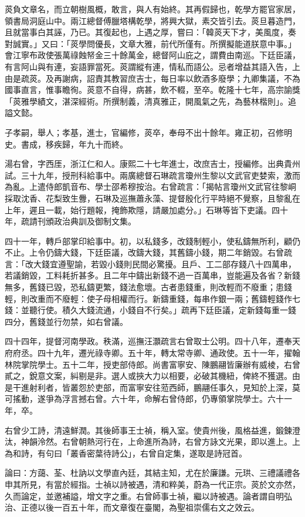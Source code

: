 \begin{pinyinscope}
菼負文章名，而立朝樹風概，敢言，與人有始終。其再假歸也，乾學方罷官家居，領書局洞庭山中。兩江總督傅臘塔構乾學，將興大獄，素交皆引去。菼旦暮造門，且就當事白其誣，乃已。其復起也，上遇之厚，嘗曰：「韓菼天下才，美風度，奏對誠實。」又曰：「菼學問優長，文章大雅，前代所僅有。所撰擬能道朕意中事。」會江寧布政使張萬祿蝕帑金三十餘萬金，總督阿山庇之，謂費由南巡。下廷臣議，有言阿山與有連，妄語罪當死。菼謂縱有連，情私而語公。忌者增益其語入告，上由是疏菼。及再謝病，詔責其教習庶吉士，每日率以飲酒多廢學；九卿集議，不為國事直言，惟事瞻徇。菼意不自得，病甚，飲不輟，至卒。乾隆十七年，高宗諭獎「菼雅學績文，湛深經術。所撰制義，清真雅正，開風氣之先，為藝林楷則」。追謚文懿。

子孝嗣，舉人；孝基，進士，官編修，菼卒，奉母不出十餘年。雍正初，召修明史。書成，移疾歸，年九十而終。

湯右曾，字西厓，浙江仁和人。康熙二十七年進士，改庶吉士，授編修。出典貴州試。三十九年，授刑科給事中。兩廣總督石琳疏言瓊州生黎以文武官吏婪索，激而為亂。上遣侍郎凱音布、學士邵希穆按治。右曾疏言：「揭帖言瓊州文武官往黎峒採取沈香、花梨致生釁，石琳及巡撫蕭永藻、提督殷化行平時絕不覺察，且黎亂在上年，遲且一載，始行題報，掩飾欺隱，請嚴加處分。」石琳等皆下吏議。四十年，疏請刊頒政治典訓及御制文集。

四十一年，轉戶部掌印給事中。初，以私錢多，改錢制輕小，使私鑄無所利，顧仍不止。上令仍鑄大錢，下廷臣議，改鑄大錢，其舊鑄小錢，期二年銷毀。右曾疏言：「改大錢宜遵聖諭，若毀小錢則民間必驚擾。且戶、工二部存錢八十四萬串，若議銷毀，工料耗折甚多。且二年中鑄出新錢不過一百萬串，豈能遍及各省？新錢無多，舊錢已毀，恐私鑄更繁，錢法愈壞。古者患錢重，則改輕而不廢重；患錢輕，則改重而不廢輕：使子母相權而行。新鑄重錢，每串作銀一兩；舊鑄輕錢作七錢：並聽行使。積久大錢流通，小錢自不行矣。」疏再下廷臣議，定新錢每重一錢四分，舊錢並行勿禁，如右曾議。

四十四年，提督河南學政。秩滿，巡撫汪灝疏言右曾取士公明。四十八年，遷奉天府府丞。四十九年，遷光祿寺卿。五十年，轉太常寺卿、通政使。五十一年，擢翰林院掌院學士。五十二年，授吏部侍郎。尚書富寧安、陳鵬翮皆廉辦有威棱，右曾貳之，銳意文案，糾剔是非。選人或挾大力以相要，必破其機紐，俾終不獲選。由是干進射利者，皆叢怨於吏部，而富寧安往蒞西師，鵬翮任事久，見知於上深，莫可搖動，遂爭為浮言撼右曾。六十年，命解右曾侍郎，仍專領掌院學士。六十一年，卒。

右曾少工詩，清遠鮮潤。其後師事王士禎，稱入室。使貴州後，風格益進，鍛鍊澄汰，神韻泠然。右曾朝熱河行在，上命進所為詩，右曾方詠文光果，即以進上。上為和詩，有句曰「叢香密葉待詩公」，右曾自定集，遂取是詩冠首。

論曰：方藹、荃、杜訥以文學直內廷，其結主知，尤在於廉謙。元珙、三禮議禮各申其所見，有當於經指。士禎以詩被遇，清和粹美，蔚為一代正宗。菼於文亦然，久而論定，並邀補謚，增文字之重。右曾師事士禎，繼以詩被遇。論者謂自明弘治、正德以後一百五十年，而文章復在臺閣，為聖祖崇儒右文之效云。


\end{pinyinscope}